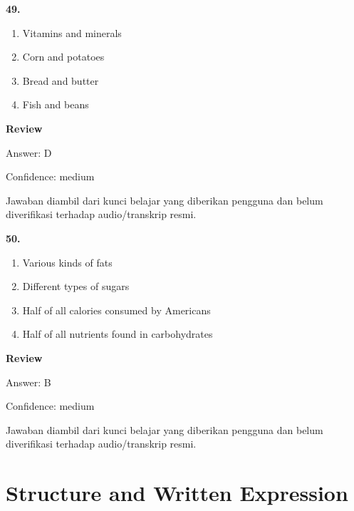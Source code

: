 \documentclass[12pt]{article}
\begin{document}
\endgroup
\par
\vspace{0.25\baselineskip}
\noindent\textbf{49.}
\begin{enumerate}[label=(\Alph*),leftmargin=*,itemsep=0.2em]
\item Vitamins and minerals
\item Corn and potatoes
\item Bread and butter
\item Fish and beans
\end{enumerate}
\par
\begingroup
\setlength{\parskip}{0pt}
\setlength{\parindent}{0pt}
\textbf{Review}\par
Answer: D\par
Confidence: medium\par
Jawaban diambil dari kunci belajar yang diberikan pengguna dan belum diverifikasi terhadap audio/transkrip resmi.\par
\endgroup
\par
\vspace{0.25\baselineskip}
\noindent\textbf{50.}
\begin{enumerate}[label=(\Alph*),leftmargin=*,itemsep=0.2em]
\item Various kinds of fats
\item Different types of sugars
\item Half of all calories consumed by Americans
\item Half of all nutrients found in carbohydrates
\end{enumerate}
\par
\begingroup
\setlength{\parskip}{0pt}
\setlength{\parindent}{0pt}
\textbf{Review}\par
Answer: B\par
Confidence: medium\par
Jawaban diambil dari kunci belajar yang diberikan pengguna dan belum diverifikasi terhadap audio/transkrip resmi.\par
\endgroup
\par
\vspace{0.25\baselineskip}
\section*{Structure and Written Expression}
\end{document}
